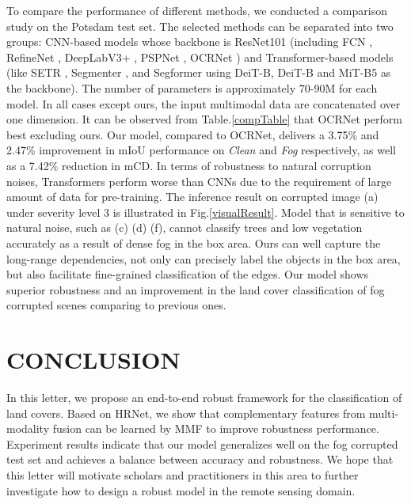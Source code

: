 \documentclass[lettersize,journal]{IEEEtran}
\begin{document}
      To compare the performance of different methods, we conducted a comparison study on the Potsdam test set. The selected methods can be separated into two groups: CNN-based models whose backbone is ResNet101 (including FCN \cite{shelhamerFullyConvolutionalNetworks2017}, RefineNet \cite{Lin2017RefineNetMR}, DeepLabV3+ \cite{chenEncoderDecoderAtrousSeparable2018}, PSPNet \cite{zhaoPyramidSceneParsing2017}, OCRNet \cite{yuanSegmentationTransformerObjectContextual2021}) and Transformer-based models (like SETR \cite{zhengRethinkingSemanticSegmentation2021a}, Segmenter \cite{strudelSegmenterTransformerSemantic2021}, and Segformer \cite{xieSegFormerSimpleEfficient2021} using DeiT-B, DeiT-B and MiT-B5 \cite{xieSegFormerSimpleEfficient2021} as the backbone). The number of parameters is approximately 70-90M for each model. In all cases except ours, the input multimodal data are concatenated over one dimension. It can be observed from Table.\ref{compTable} that OCRNet perform best excluding ours. Our model, compared to OCRNet, delivers a 3.75\% and 2.47\% improvement in mIoU performance on \emph{Clean} and \emph{Fog} respectively, as well as a 7.42\% reduction in mCD. In terms of robustness to natural corruption noises, Transformers perform worse than CNNs due to the requirement of large amount of data for pre-training.  The inference result on corrupted image (a) under severity level 3 is illustrated in Fig.\ref{visualResult}. Model that is sensitive to natural noise, such as (c) (d) (f), cannot classify trees and low vegetation accurately as a result of dense fog in the box area. Ours can well capture the long-range dependencies, not only can precisely label the objects in the box area, but also facilitate fine-grained classification of the edges.  Our model shows superior robustness and an improvement in the land cover classification of fog corrupted scenes comparing to previous ones.

\section{CONCLUSION}
In this letter, we propose an end-to-end robust framework for the classification of land covers. Based on HRNet, we show that complementary features from multi-modality fusion can be learned by MMF to improve robustness performance.
Experiment results indicate that our model generalizes well on the fog corrupted test set and achieves a balance between accuracy and robustness. We hope that this letter will motivate scholars and practitioners in this area to further investigate how to design a robust model in the remote sensing domain.



 
\end{document}
